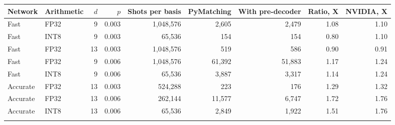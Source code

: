 \begin{tabular}{@{}llrrrrrrr@{}}
\toprule
Network & Arithmetic & $d$ & $p$ & Shots per basis & PyMatching & With pre-decoder & Ratio, X & NVIDIA, X \\
\midrule
Fast & FP32 & 9 & 0.003 & 1{,}048{,}576 & 2{,}605 & 2{,}479 & 1.08 & 1.10 \\
Fast & INT8 & 9 & 0.003 & 65{,}536 & 154 & 154 & 0.80 & 1.10 \\
Fast & FP32 & 13 & 0.003 & 1{,}048{,}576 & 519 & 586 & 0.90 & 0.91 \\
Fast & FP32 & 9 & 0.006 & 1{,}048{,}576 & 61{,}392 & 51{,}883 & 1.17 & 1.24 \\
Fast & INT8 & 9 & 0.006 & 65{,}536 & 3{,}887 & 3{,}317 & 1.14 & 1.24 \\
Accurate & FP32 & 13 & 0.003 & 524{,}288 & 223 & 176 & 1.29 & 1.32 \\
Accurate & FP32 & 13 & 0.006 & 262{,}144 & 11{,}577 & 6{,}747 & 1.72 & 1.76 \\
Accurate & INT8 & 13 & 0.006 & 65{,}536 & 2{,}849 & 1{,}922 & 1.51 & 1.76 \\
\botrule
\end{tabular}
